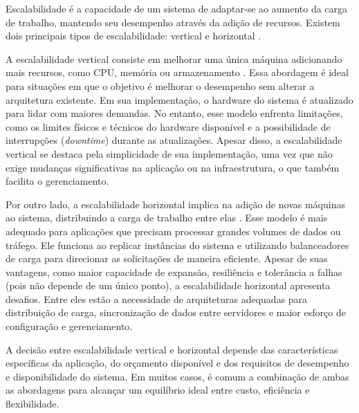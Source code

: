 

Escalabilidade é a capacidade de um sistema de adaptar-se ao aumento da carga de trabalho, mantendo seu desempenho através da adição de recursos. Existem dois principais tipos de escalabilidade: vertical e horizontal \cite{what-is-scalability}.

A escalabilidade vertical consiste em melhorar uma única máquina adicionando mais recursos, como CPU, memória ou armazenamento \cite{what-is-scalability}. Essa abordagem é ideal para situações em que o objetivo é melhorar o desempenho sem alterar a arquitetura existente. Em sua implementação, o hardware do sistema é atualizado para lidar com maiores demandas. No entanto, esse modelo enfrenta limitações, como os limites físicos e técnicos do hardware disponível e a possibilidade de interrupções (\emph{downtime}) durante as atualizações. Apesar disso, a escalabilidade vertical se destaca pela simplicidade de sua implementação, uma vez que não exige mudanças significativas na aplicação ou na infraestrutura, o que também facilita o gerenciamento.

Por outro lado, a escalabilidade horizontal implica na adição de novas máquinas ao sistema, distribuindo a carga de trabalho entre elas \cite{what-is-scalability}. Esse modelo é mais adequado para aplicações que precisam processar grandes volumes de dados ou tráfego. Ele funciona ao replicar instâncias do sistema e utilizando balanceadores de carga para direcionar as solicitações de maneira eficiente. Apesar de suas vantagens, como maior capacidade de expansão, resiliência e tolerância a falhas (pois não depende de um único ponto), a escalabilidade horizontal apresenta desafios. Entre eles estão a necessidade de arquiteturas adequadas para distribuição de carga, sincronização de dados entre servidores e maior esforço de configuração e gerenciamento.

A decisão entre escalabilidade vertical e horizontal depende das características específicas da aplicação, do orçamento disponível e dos requisitos de desempenho e disponibilidade do sistema. Em muitos casos, é comum a combinação de ambas as abordagens para alcançar um equilíbrio ideal entre custo, eficiência e flexibilidade.

